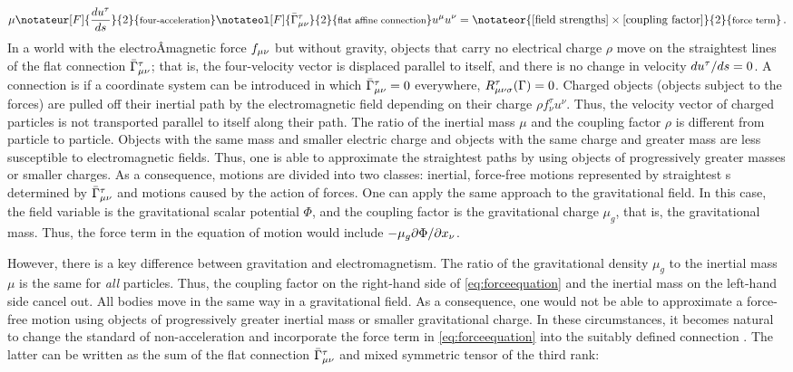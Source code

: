 \documentclass[final]{article}
\newcommand{\faraday}{\ensuremath{f}}
\newcommand{\christoffelmnt}{\christoffel{\mu}{\nu}{\tau}}
\newcommand{\Gtmnbar}{\ensuremath{\bar{\Gamma}\tmn}\xspace}
\begin{document}
\begin{equation}
\label{eq:forceequation} 
\mu \notateur[F]{\frac{du^\tau}{\dap}}{2}{\texts{four-acceleration}} \notateol[F]{\Gtmnbar}{2}{\texts{flat affine connection}} u^\mu u^\nu = \notateor{\text{[field strengths]} \times \text{[coupling factor]}}{2}{\texts{force term}} \,.
\end{equation}
In a world with the electroÂ­magnetic force $\faraday\mn$ but without gravity, objects that carry no electrical charge $\rho$ move on the straightest lines of the flat connection $\Gtmnbar$; that is, the four-velocity vector is displaced parallel to itself, and there is no change in velocity ${du^\tau}/{ds}=0$. A connection is  if a coordinate system can be introduced in which $\Gtmnbar=0$ everywhere, \ie $R_{\mu \nu \sigma}^{\tau}(\Gamma)=0$. Charged objects (objects subject to the forces) are pulled off their inertial path by the electromagnetic field depending on their charge $\rho f^\tau_\nu u^\nu$. Thus, the velocity vector of charged particles is not transported parallel to itself along their path. The ratio of the inertial mass $\mu$ and the coupling factor $\rho$ is different from particle to particle. Objects with the same mass and smaller electric charge and objects with the same charge and greater mass are less susceptible to electromagnetic fields. Thus, one is able to approximate the straightest paths by using objects of progressively greater masses or smaller charges. As a consequence, motions are divided into two classes: inertial, force-free motions represented by straightest \wl{}s determined by $\Gtmnbar$ and motions caused by the action of forces. One can apply the same approach to the gravitational field. In this case, the field variable is the gravitational scalar potential $\Phi$, and the coupling factor is the gravitational charge $\mu_g$, that is, the gravitational mass. Thus, the force term in the equation of motion would include $-\mu_g {\partial \Phi}/{\partial x_\nu}$. 


However, there is a key difference between gravitation and electromagnetism. The ratio of the gravitational  density $\mu_g$ to the inertial mass $\mu$ is the same for \emph{all} particles. Thus, the coupling factor on the right-hand side of \cref{eq:forceequation} and the inertial mass on the left-hand side cancel out. All bodies move in the same way in a gravitational field. As a consequence, one would not be able to approximate a force-free motion using objects of progressively greater inertial mass or smaller gravitational charge. In these circumstances, it becomes natural to change the standard of non-acceleration and incorporate the force term in \cref{eq:forceequation} into the suitably defined connection \Gtmn. The latter can be written as the sum of the flat connection \Gtmnbar and mixed symmetric tensor of the third rank: 
\end{document}
